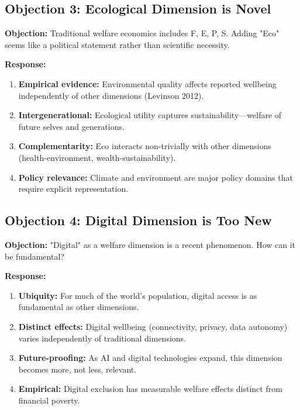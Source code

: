 \subsection{Objection 3: Ecological Dimension is Novel}

\textbf{Objection:} Traditional welfare economics includes F, E, P, S. Adding 
"Eco" seems like a political statement rather than scientific necessity.

\textbf{Response:}
\begin{enumerate}[nosep]
    \item \textbf{Empirical evidence:} Environmental quality affects reported 
    wellbeing independently of other dimensions (Levinson 2012).
    \item \textbf{Intergenerational:} Ecological utility captures 
    sustainability---welfare of future selves and generations.
    \item \textbf{Complementarity:} Eco interacts non-trivially with other 
    dimensions (health-environment, wealth-sustainability).
    \item \textbf{Policy relevance:} Climate and environment are major policy 
    domains that require explicit representation.
\end{enumerate}

\subsection{Objection 4: Digital Dimension is Too New}

\textbf{Objection:} "Digital" as a welfare dimension is a recent phenomenon. 
How can it be fundamental?

\textbf{Response:}
\begin{enumerate}[nosep]
    \item \textbf{Ubiquity:} For much of the world's population, digital access 
    is as fundamental as other dimensions.
    \item \textbf{Distinct effects:} Digital wellbeing (connectivity, privacy, 
    data autonomy) varies independently of traditional dimensions.
    \item \textbf{Future-proofing:} As AI and digital technologies expand, 
    this dimension becomes more, not less, relevant.
    \item \textbf{Empirical:} Digital exclusion has measurable welfare effects 
    distinct from financial poverty.
\end{enumerate}



